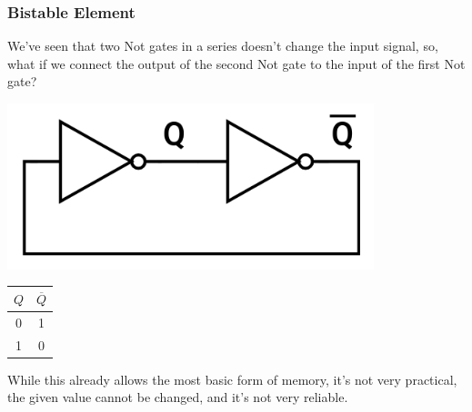 \documentclass[12pt,openany]{book}
\begin{document}
\subsubsection{Bistable Element}
We've seen that two Not gates in a series doesn't change the input signal, so, what if we connect the output of the second Not gate to the input of the first Not gate? \newline
\vspace*{20px} 
\noindent
\begin{minipage}{0.40\textwidth}
	\begin{center}
		\includegraphics[width=0.80\textwidth]{circuits/12.1.3.png}
	\end{center}
\end{minipage}
\hfill
\vline
\hfill
\begin{minipage}{0.50\textwidth}
	\begin{center}
		\large
		\begin{tabular}{|c|c|}
			\hline
			
			$Q$ & $\overline{Q}$ \\
			\hline
			0 & 1 \\
			1 & 0 \\
			\hline
		\end{tabular}
	\end{center}
\end{minipage}
\newline
\vspace*{15px}
While this already allows the most basic form of memory, it's not very practical, the given value cannot be changed, and it's not very reliable.

\newpage
\end{document}
